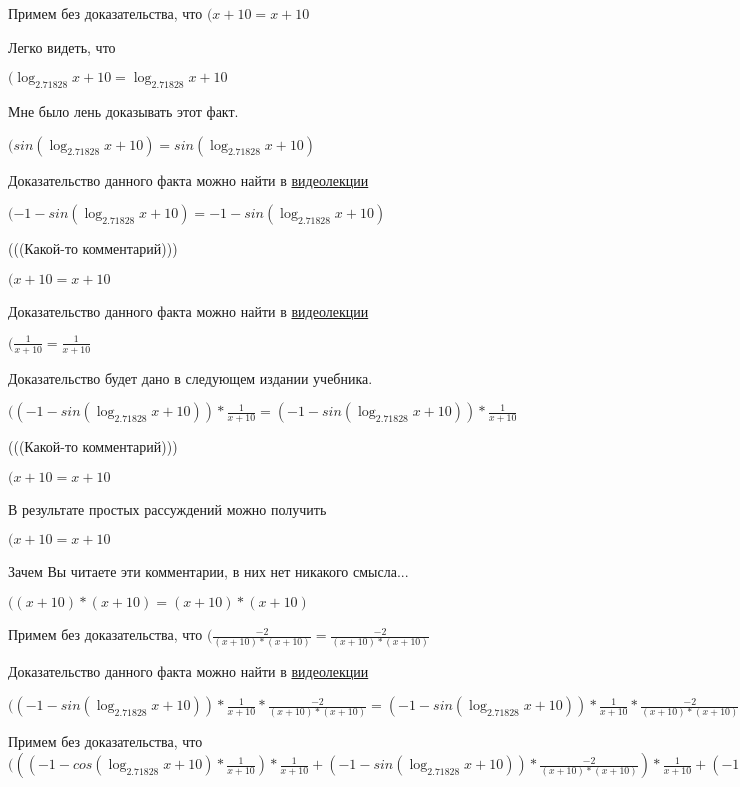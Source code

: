 \documentclass[12pt,a4paper,fleqn]{article}
\theoremstyle{definition}
\begin{document}
Примем без доказательства, что
$( x  +  10  =  x  +  10 $

Легко видеть, что

$(\log_{ 2.71828 }{ x  +  10 } = \log_{ 2.71828 }{ x  +  10 }$

Мне было лень доказывать этот факт.

$(sin(\log_{ 2.71828 }{ x  +  10 }) = sin(\log_{ 2.71828 }{ x  +  10 })$

Доказательство данного факта можно найти в \href{https://www.youtube.com/watch?v=dQw4w9WgXcQ}{видеолекции}

$( -1  - sin(\log_{ 2.71828 }{ x  +  10 }) =  -1  - sin(\log_{ 2.71828 }{ x  +  10 })$

(((Какой-то комментарий)))

$( x  +  10  =  x  +  10 $

Доказательство данного факта можно найти в \href{https://www.youtube.com/watch?v=dQw4w9WgXcQ}{видеолекции}

$(\frac{ 1 }{ x  +  10 }
 = \frac{ 1 }{ x  +  10 }
$

Доказательство будет дано в следующем издании учебника.

$(( -1  - sin(\log_{ 2.71828 }{ x  +  10 })) * \frac{ 1 }{ x  +  10 }
 = ( -1  - sin(\log_{ 2.71828 }{ x  +  10 })) * \frac{ 1 }{ x  +  10 }
$

(((Какой-то комментарий)))

$( x  +  10  =  x  +  10 $

В результате простых рассуждений можно получить

$( x  +  10  =  x  +  10 $

Зачем Вы читаете эти комментарии, в них нет никакого смысла...

$(( x  +  10 ) * ( x  +  10 ) = ( x  +  10 ) * ( x  +  10 )$

Примем без доказательства, что
$(\frac{ -2 }{( x  +  10 ) * ( x  +  10 )}
 = \frac{ -2 }{( x  +  10 ) * ( x  +  10 )}
$

Доказательство данного факта можно найти в \href{https://www.youtube.com/watch?v=dQw4w9WgXcQ}{видеолекции}

$(( -1  - sin(\log_{ 2.71828 }{ x  +  10 })) * \frac{ 1 }{ x  +  10 }
 * \frac{ -2 }{( x  +  10 ) * ( x  +  10 )}
 = ( -1  - sin(\log_{ 2.71828 }{ x  +  10 })) * \frac{ 1 }{ x  +  10 }
 * \frac{ -2 }{( x  +  10 ) * ( x  +  10 )}
$

Примем без доказательства, что
$((( -1  - cos(\log_{ 2.71828 }{ x  +  10 }) * \frac{ 1 }{ x  +  10 }
) * \frac{ 1 }{ x  +  10 }
 + ( -1  - sin(\log_{ 2.71828 }{ x  +  10 })) * \frac{ -2 }{( x  +  10 ) * ( x  +  10 )}
) * \frac{ 1 }{ x  +  10 }
 + ( -1  - sin(\log_{ 2.71828 }{ x  +  10 })) * \frac{ 1 }{ x  +  10 }
 * \frac{ -2 }{( x  +  10 ) * ( x  +  10 )}
 = (( -1  - cos(\log_{ 2.71828 }{ x  +  10 }) * \frac{ 1 }{ x  +  10 }
) * \frac{ 1 }{ x  +  10 }
 + ( -1  - sin(\log_{ 2.71828 }{ x  +  10 })) * \frac{ -2 }{( x  +  10 ) * ( x  +  10 )}
) * \frac{ 1 }{ x  +  10 }
 + ( -1  - sin(\log_{ 2.71828 }{ x  +  10 })) * \frac{ 1 }{ x  +  10 }
 * \frac{ -2 }{( x  +  10 ) * ( x  +  10 )}
$
\end{document}

